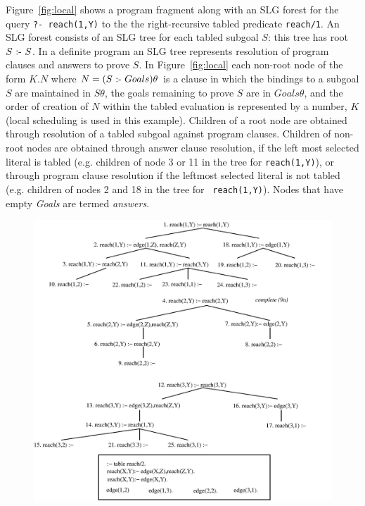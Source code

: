 \begin{example} \rm 
Figure~\ref{fig:local} shows a program fragment along with an SLG
forest for the query {\tt ?- reach(1,Y)} to the the right-recursive
tabled predicate {\tt reach/1}.  An SLG forest consists of an SLG tree
for each tabled subgoal $S$: this tree has root $S \mbox{ :- }{} S$.  In a
definite program an SLG tree represents resolution of program clauses
and answers to prove $S$.  In Figure~\ref{fig:local} each non-root
node of the form $K. N$ where $N = (S \mbox{ :- }{} Goals)\theta$ is a clause
in which the bindings to a subgoal $S$ are maintained in $S\theta$,
the goals remaining to prove $S$ are in $Goals\theta$, and the order
of creation of $N$ within the tabled evaluation is represented by a
number, $K$ (local scheduling is used in this example).  Children of a
root node are obtained through resolution of a tabled subgoal against
program clauses.  Children of non-root nodes are obtained through
answer clause resolution, if the left most selected literal is tabled
(e.g. children of node 3 or 11 in the tree for {\tt reach(1,Y)}), or
through program clause resolution if the leftmost selected literal is
not tabled (e.g. children of nodes 2 and 18 in the tree for {\tt
  reach(1,Y)}).  Nodes that have empty {\em Goals} are termed {\em
  answers}.
%
\begin{figure}[htbp]
\centering
\includegraphics[width=.99\textwidth]{slg-forest-local}

\end{figure}
\end{example}
